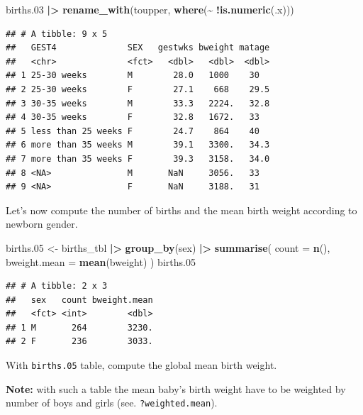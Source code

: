 \documentclass[
]{book}
\newenvironment{Shaded}{\begin{snugshade}}{\end{snugshade}}
\newcommand{\AttributeTok}[1]{\textcolor[rgb]{0.13,0.29,0.53}{#1}}
\newcommand{\FloatTok}[1]{\textcolor[rgb]{0.00,0.00,0.81}{#1}}
\newcommand{\FunctionTok}[1]{\textcolor[rgb]{0.13,0.29,0.53}{\textbf{#1}}}
\newcommand{\NormalTok}[1]{#1}
\newcommand{\OtherTok}[1]{\textcolor[rgb]{0.56,0.35,0.01}{#1}}
\newcommand{\SpecialCharTok}[1]{\textcolor[rgb]{0.81,0.36,0.00}{\textbf{#1}}}
\begin{document}
\begin{Shaded}
\begin{Highlighting}[]
\NormalTok{births}\FloatTok{.03} \SpecialCharTok{|\textgreater{}}
  \FunctionTok{rename\_with}\NormalTok{(toupper, }\FunctionTok{where}\NormalTok{(}\SpecialCharTok{\textasciitilde{}} \SpecialCharTok{!}\FunctionTok{is.numeric}\NormalTok{(.x)))}
\end{Highlighting}
\end{Shaded}

\begin{verbatim}
## # A tibble: 9 x 5
##   GEST4              SEX   gestwks bweight matage
##   <chr>              <fct>   <dbl>   <dbl>  <dbl>
## 1 25-30 weeks        M        28.0   1000    30  
## 2 25-30 weeks        F        27.1    668    29.5
## 3 30-35 weeks        M        33.3   2224.   32.8
## 4 30-35 weeks        F        32.8   1672.   33  
## 5 less than 25 weeks F        24.7    864    40  
## 6 more than 35 weeks M        39.1   3300.   34.3
## 7 more than 35 weeks F        39.3   3158.   34.0
## 8 <NA>               M       NaN     3056.   33  
## 9 <NA>               F       NaN     3188.   31
\end{verbatim}

Let's now compute the number of births and the mean birth weight according to newborn gender.

\begin{Shaded}
\begin{Highlighting}[]
\NormalTok{births}\FloatTok{.05} \OtherTok{\textless{}{-}}
\NormalTok{  births\_tbl }\SpecialCharTok{|\textgreater{}}
  \FunctionTok{group\_by}\NormalTok{(sex) }\SpecialCharTok{|\textgreater{}}
  \FunctionTok{summarise}\NormalTok{(}
    \AttributeTok{count =} \FunctionTok{n}\NormalTok{(),}
    \AttributeTok{bweight.mean =} \FunctionTok{mean}\NormalTok{(bweight)}
\NormalTok{  )}
\NormalTok{births}\FloatTok{.05}
\end{Highlighting}
\end{Shaded}

\begin{verbatim}
## # A tibble: 2 x 3
##   sex   count bweight.mean
##   <fct> <int>        <dbl>
## 1 M       264        3230.
## 2 F       236        3033.
\end{verbatim}

With \texttt{births.05} table, compute the global mean birth weight.

\textbf{Note:} with such a table the mean baby's birth weight have to be weighted by number of boys and girls (see. \texttt{?weighted.mean}).
\end{document}
